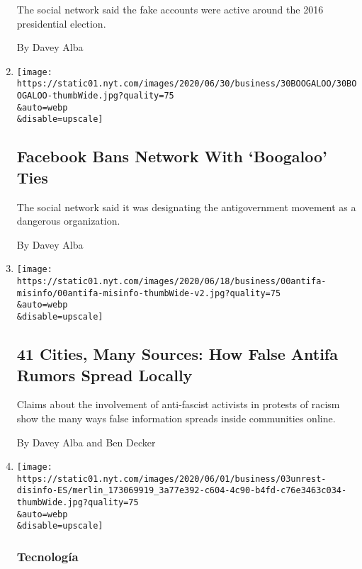 \begin{enumerate}
  The social network said the fake accounts were active around the 2016
  presidential election.

  By Davey Alba
\item
  \href{/2020/06/30/technology/facebook-ban-boogaloo.html}{}

  \texttt{[image: https://static01.nyt.com/images/2020/06/30/business/30BOOGALOO/30BOOGALOO-thumbWide.jpg?quality=75\\\&auto=webp\\\&disable=upscale]}

  \hypertarget{facebook-bans-network-with-boogaloo-ties}{%
  \subsection{Facebook Bans Network With `Boogaloo'
  Ties}\label{facebook-bans-network-with-boogaloo-ties}}

  The social network said it was designating the antigovernment movement
  as a dangerous organization.

  By Davey Alba
\item
  \href{/2020/06/22/technology/antifa-local-disinformation.html}{}

  \texttt{[image: https://static01.nyt.com/images/2020/06/18/business/00antifa-misinfo/00antifa-misinfo-thumbWide-v2.jpg?quality=75\\\&auto=webp\\\&disable=upscale]}

  \hypertarget{41-cities-many-sources-how-false-antifa-rumors-spread-locally}{%
  \subsection{41 Cities, Many Sources: How False Antifa Rumors Spread
  Locally}\label{41-cities-many-sources-how-false-antifa-rumors-spread-locally}}

  Claims about the involvement of anti-fascist activists in protests of
  racism show the many ways false information spreads inside communities
  online.

  By Davey Alba and Ben Decker
\item
  \href{/es/2020/06/03/espanol/ciencia-y-tecnologia/george-floyd-desinformacion-fake-news.html}{}

  \texttt{[image: https://static01.nyt.com/images/2020/06/01/business/03unrest-disinfo-ES/merlin\_173069919\_3a77e392-c604-4c90-b4fd-c76e3463c034-thumbWide.jpg?quality=75\\\&auto=webp\\\&disable=upscale]}

  \hypertarget{tecnologuxeda}{%
  \subsubsection{Tecnología}\label{tecnologuxeda}}


\end{enumerate}
